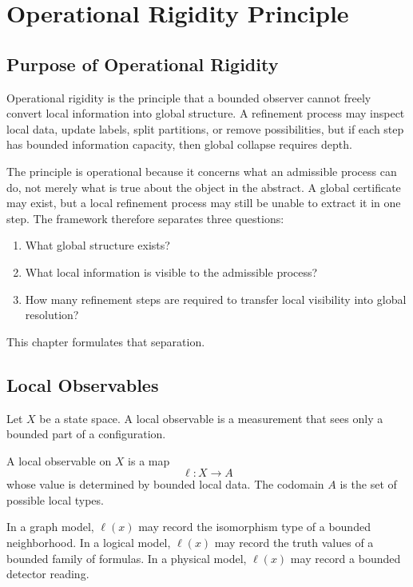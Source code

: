 \chapter{Operational Rigidity Principle}

\section{Purpose of Operational Rigidity}

Operational rigidity is the principle that a bounded observer cannot freely
convert local information into global structure. A refinement process may
inspect local data, update labels, split partitions, or remove possibilities,
but if each step has bounded information capacity, then global collapse
requires depth.

The principle is operational because it concerns what an admissible process can
do, not merely what is true about the object in the abstract. A global
certificate may exist, but a local refinement process may still be unable to
extract it in one step. The framework therefore separates three questions:

\begin{enumerate}
\item What global structure exists?
\item What local information is visible to the admissible process?
\item How many refinement steps are required to transfer local visibility into
global resolution?
\end{enumerate}

This chapter formulates that separation.

\section{Local Observables}

Let \(X\) be a state space. A local observable is a measurement that sees only
a bounded part of a configuration.

\begin{definition}
A local observable on \(X\) is a map
\[
\ell:X\to A
\]
whose value is determined by bounded local data. The codomain \(A\) is the set
of possible local types.
\end{definition}

In a graph model, \(\ell(x)\) may record the isomorphism type of a bounded
neighborhood. In a logical model, \(\ell(x)\) may record the truth values of a
bounded family of formulas. In a physical model, \(\ell(x)\) may record a
bounded detector reading.

